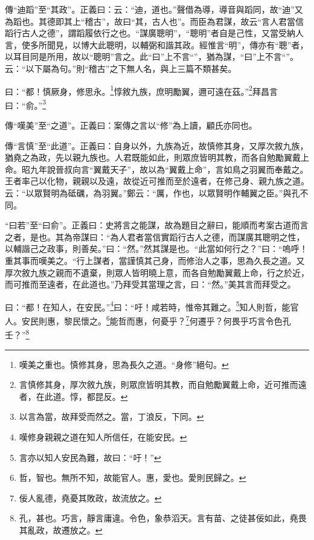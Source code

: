 {\noindent\zhuan{}\fzbyks 傳“迪蹈”至“其政”。正義曰：云：“迪，道也。”聲借為導，導音與蹈同，故“迪”又為蹈也。其德即其上“稽古”，故曰“其，古人也”。而臣為君謀，故云“言人君當信蹈行古人之德”，謂蹈履依行之也。“謀廣聰明”，“聰明”者自是己性，又當受納人言，使多所聞見，以博大此聰明，以輔弼和諧其政。經惟言“明”，傳亦有“聰”者，以耳目同是所用，故以“聰明”言之。此“曰”上不言“”，猶為謀，“曰”上不言“”。云：“以下屬為句。”則“稽古”之下無人名，與上三篇不類甚矣。 \par}

曰：“都！慎厥身，修思永。\footnote{嘆美之重也。慎修其身，思為長久之道。“身修”絕句。}惇敘九族，庶明勵翼，邇可遠在茲。”\footnote{言慎修其身，厚次敘九族，則眾庶皆明其教，而自勉勵翼戴上命，近可推而遠者，在此道。惇，都昆反。}拜昌言曰：“俞。”\footnote{以言為當，故拜受而然之。當，丁浪反，下同。}

{\noindent\zhuan{}\fzbyks 傳“嘆美”至“之道”。正義曰：案傳之言以“修”為上讀，顧氏亦同也。 \par}

{\noindent\zhuan{}\fzbyks 傳“言慎”至“此道”。正義曰：自身以外，九族為近，故慎修其身，又厚次敘九族，猶堯之為政，先以親九族也。人君既能如此，則眾庶皆明其教，而各自勉勵翼戴上命。昭九年說晉叔向言“翼戴天子”，故以為“翼戴上命”，言如鳥之羽翼而奉戴之。王者率己以化物，親親以及遠，故從近可推而至於遠者，在修己身、親九族之道。云：“以眾賢明為砥礪，為羽翼。”鄭云：“厲，作也，以眾賢明作輔翼之臣。”與孔不同。 \par}

{\noindent\shu{}\fzkt “曰若”至“曰俞”。正義曰：史將言之能謀，故為題目之辭曰，能順而考案古道而言之者，是也。其為帝謀曰：“為人君者當信實蹈行古人之德，而謀廣其聰明之性，以輔諧己之政事，則善矣。”曰：“然。”然其謀是也。“此當如何行之？”曰：“嗚呼！重其事而嘆美之。“行上謀者，當謹慎其己身，而修治人之事，思為久長之道。又厚次敘九族之親而不遺棄，則眾人皆明曉上意，而各自勉勵翼戴上命，行之於近，而可推而至遠者，在此道也。”乃拜受其當理之言，曰：“然。”美其言而拜受之。 \par}

曰：“都！在知人，在安民。”\footnote{嘆修身親親之道在知人所信任，在能安民。}曰：“吁！咸若時，惟帝其難之。\footnote{言亦以知人安民為難，故曰：“吁！”}知人則哲，能官人。安民則惠，黎民懷之。\footnote{哲，智也。無所不知，故能官人。惠，愛也。愛則民歸之。}能哲而惠，何憂乎？\footnote{佞人亂德，堯憂其敗政，故流放之。}何遷乎？何畏乎巧言令色孔壬？”\footnote{孔，甚也。巧言，靜言庸違。令色，象恭滔天。言有苗、之徒甚佞如此，堯畏其亂政，故遷放之。}


